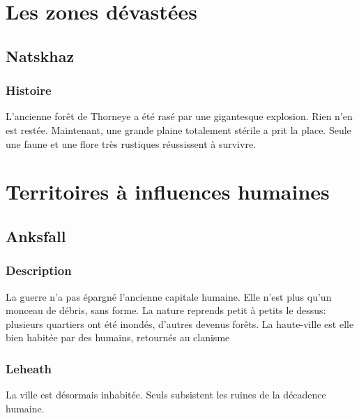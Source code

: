 \section{Les zones dévastées}
\subsection{Natskhaz}
\subsubsection{Histoire}
\hypertarget{natskhaz}{}L'ancienne forêt de Thorneye a été rasé par une gigantesque explosion.
Rien n'en est restée.
Maintenant, une grande plaine totalement stérile a prit la place.
Seule une faune et une flore très rustiques réussissent à survivre.

\section{Territoires à influences humaines}
\subsection{Anksfall}
\subsubsection{Description}
La guerre n'a pas épargné l'ancienne capitale humaine. Elle n'est plus qu'un monceau de débris, sans forme. La nature reprends petit à petits le dessus: plusieurs quartiers ont été inondés, d'autres devenus forêts.
\newline
La haute-ville est elle bien habitée par des humains, retournés au clanisme

\subsubsection{Leheath}
La ville est désormais inhabitée. Seuls subsistent les ruines de la décadence humaine.